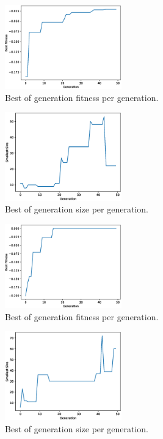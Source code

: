 \documentclass[11pt]{article}
\begin{document}
\begin{multicols}{2}
\centering
\begin{figure}[H]
\includegraphics[width=0.45\textwidth]{images/genetic_best_fitness.eps}
\caption{Best of generation fitness per generation.}
\label{fig:best_fitness}
\end{figure}
\begin{figure}[H]
\includegraphics[width=0.45\textwidth]{images/genetic_best_size.eps}
\caption{Best of generation size per generation.}
\label{fig:best_size}
\end{figure}
\end{multicols}
\pagebreak

\begin{multicols}{2}
\centering
\begin{figure}[H]
\includegraphics[width=0.45\textwidth]{images/genetic_best_fitness2.eps}
\caption{Best of generation fitness per generation.}
\label{fig:best_fitness2}
\end{figure}
\begin{figure}[H]
\includegraphics[width=0.45\textwidth]{images/genetic_best_size2.eps}
\caption{Best of generation size per generation.}
\label{fig:best_size2}
\end{figure}
\end{multicols}
\end{document}
